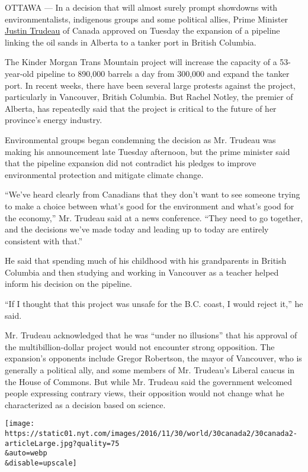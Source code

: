 OTTAWA --- In a decision that will almost surely prompt showdowns with
environmentalists, indigenous groups and some political allies, Prime
Minister
\href{http://www.nytimes.com/2016/09/15/world/canada/justin-trudeau.html}{Justin
Trudeau} of Canada approved on Tuesday the expansion of a pipeline
linking the oil sands in Alberta to a tanker port in British Columbia.

The Kinder Morgan Trans Mountain project will increase the capacity of a
53-year-old pipeline to 890,000 barrels a day from 300,000 and expand
the tanker port. In recent weeks, there have been several large protests
against the project, particularly in Vancouver, British Columbia. But
Rachel Notley, the premier of Alberta, has repeatedly said that the
project is critical to the future of her province's energy industry.

Environmental groups began condemning the decision as Mr. Trudeau was
making his announcement late Tuesday afternoon, but the prime minister
said that the pipeline expansion did not contradict his pledges to
improve environmental protection and mitigate climate change.

``We've heard clearly from Canadians that they don't want to see someone
trying to make a choice between what's good for the environment and
what's good for the economy,'' Mr. Trudeau said at a news conference.
``They need to go together, and the decisions we've made today and
leading up to today are entirely consistent with that.''

He said that spending much of his childhood with his grandparents in
British Columbia and then studying and working in Vancouver as a teacher
helped inform his decision on the pipeline.

``If I thought that this project was unsafe for the B.C. coast, I would
reject it,'' he said.

Mr. Trudeau acknowledged that he was ``under no illusions'' that his
approval of the multibillion-dollar project would not encounter strong
opposition. The expansion's opponents include Gregor Robertson, the
mayor of Vancouver, who is generally a political ally, and some members
of Mr. Trudeau's Liberal caucus in the House of Commons. But while Mr.
Trudeau said the government welcomed people expressing contrary views,
their opposition would not change what he characterized as a decision
based on science.

\texttt{[image: https://static01.nyt.com/images/2016/11/30/world/30canada2/30canada2-articleLarge.jpg?quality=75\\\&auto=webp\\\&disable=upscale]}


